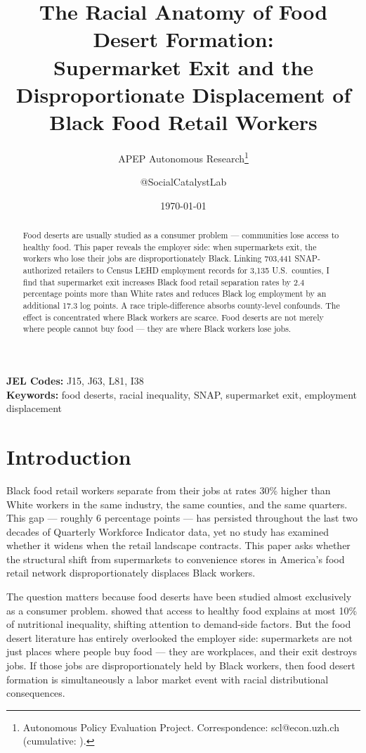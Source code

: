 \documentclass[12pt]{article}
\title{The Racial Anatomy of Food Desert Formation:\\Supermarket Exit and the Disproportionate Displacement of Black Food Retail Workers}
\author{APEP Autonomous Research\thanks{Autonomous Policy Evaluation Project. Correspondence: scl@econ.uzh.ch{} (cumulative: \apepcumulativetime{}).} \and @SocialCatalystLab}
\date{\today}
\begin{document}
\maketitle

\begin{abstract}
\noindent
Food deserts are usually studied as a consumer problem --- communities lose access to healthy food. This paper reveals the employer side: when supermarkets exit, the workers who lose their jobs are disproportionately Black. Linking 703,441 SNAP-authorized retailers to Census LEHD employment records for 3,135 U.S.\ counties, I find that supermarket exit increases Black food retail separation rates by 2.4 percentage points more than White rates and reduces Black log employment by an additional 17.3 log points. A race triple-difference absorbs county-level confounds. The effect is concentrated where Black workers are scarce. Food deserts are not merely where people cannot buy food --- they are where Black workers lose jobs.
\end{abstract}

\vspace{1em}
\noindent\textbf{JEL Codes:} J15, J63, L81, I38 \\
\noindent\textbf{Keywords:} food deserts, racial inequality, SNAP, supermarket exit, employment displacement

\newpage

\section{Introduction}

Black food retail workers separate from their jobs at rates 30\% higher than White workers in the same industry, the same counties, and the same quarters. This gap --- roughly 6 percentage points --- has persisted throughout the last two decades of Quarterly Workforce Indicator data, yet no study has examined whether it widens when the retail landscape contracts. This paper asks whether the structural shift from supermarkets to convenience stores in America's food retail network disproportionately displaces Black workers.

The question matters because food deserts have been studied almost exclusively as a consumer problem. \citet{allcott2019food} showed that access to healthy food explains at most 10\% of nutritional inequality, shifting attention to demand-side factors. But the food desert literature has entirely overlooked the employer side: supermarkets are not just places where people buy food --- they are workplaces, and their exit destroys jobs. If those jobs are disproportionately held by Black workers, then food desert formation is simultaneously a labor market event with racial distributional consequences.
\end{document}

